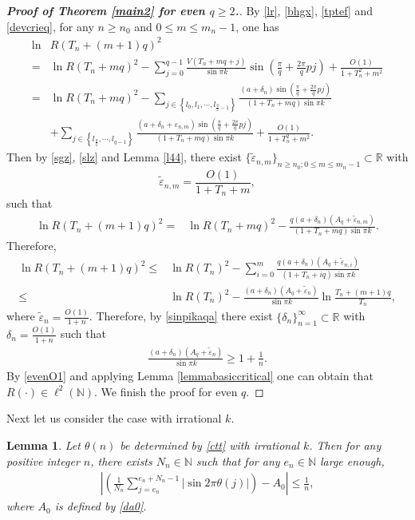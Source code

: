 \documentclass[12pt]{amsart}
\newcommand{\abs}[1]{\left\lvert #1 \right\rvert}
\theoremstyle{plain}
\newtheorem{lemma}[theorem]{Lemma}
\newcommand{\R}{\mathbb{R}}
\theoremstyle{definition}
\begin{document}
\begin{proof}[\textbf{Proof of Theorem \ref{main2} for even $q\geq2$.}]
By \eqref{lr}, \eqref{bhgx}, \eqref{tptef} and \eqref{devcrieq}, for any $n\geq n_0$ and $0\leq m\leq m_n-1$, one has
		\begin{align}
			\ln &R({T}_{n}+(m+1)q)^2\nonumber\\
=&\ln R({T}_{n}+mq)^2-\sum_{j=0}^{q-1}\frac{V({T}_{n}+mq+j)}{\sin\pi k}\sin\left(\frac{\pi}{q}+\frac{2\pi}{q}pj\right)+\frac{O(1)}{1+{T}_{n}^2+m^2}\nonumber\\
=&\ln R({T}_{n}+mq)^2-\sum_{j\in\left\{l_0,l_1,\cdots,l_{\frac{q}{2}-1}\right\}}\frac{(a+\delta_n)\sin\left(\frac{\pi}{q}+\frac{2\pi}{q}pj\right)}{(1+T_n+mq)\sin\pi k}\nonumber\\
&+\sum_{j\in\left\{l_{\frac{q}{2}},\cdots,l_{q-1}\right\}}\frac{(a+\delta_n+\varepsilon_{n,m})\sin\left(\frac{\pi}{q}+\frac{2\pi}{q}pj\right)}{(1+T_n+mq)\sin\pi k}+\frac{O(1)}{1+{T}_{n}^2+m^2}.\nonumber
		\end{align}
Then by \eqref{sgz}, \eqref{slz} and Lemma \ref{l44}, there exist $\{\tilde{\varepsilon}_{n,m}\}_{n\geq n_0;0\leq m\leq m_n-1}\subset \R$ with
$$\tilde{\varepsilon}_{n,m}=\frac{O(1)}{1+{T}_{n}+m},$$
such that
\begin{align}
	\ln R({T}_{n}+(m+1)q)^2=&\ln R({T}_{n}+mq)^2-\frac{q(a+\delta_n)(A_q+\tilde{\varepsilon}_{n,m})}{(1+T_n+mq)\sin\pi k}.\nonumber
\end{align}
Therefore,
\begin{align}
\ln R(T_n+(m+1)q)^2\leq& \ln R(T_n)^2-\sum_{i=0}^{m}\frac{q(a+\delta_n)(A_q+\tilde{\varepsilon}_{n,i})}{(1+T_n+iq)\sin\pi k}\nonumber\\
\leq &\ln R(T_n)^2-\frac{(a+\delta_n)(A_q+\tilde{\varepsilon}_n)}{\sin\pi k}\ln \frac{T_{n}+(m+1)q}{T_n},\nonumber
\end{align}
where $\tilde{\varepsilon}_n=\frac{O(1)}{1+n}$. Therefore, by \eqref{sinpikaqa} there exist $\{\delta_n\}_{n=1}^\infty\subset\R$ with $\delta_n=\frac{O(1)}{1+n}$ such that
\begin{align}
\frac{(a+\delta_n)(A_q+\tilde{\varepsilon}_n)}{\sin\pi k}\geq 1+\frac{1}{n}.\nonumber
\end{align}
By \eqref{evenO1} and applying Lemma \ref{lemmabasiccritical} one can obtain that $R(\cdot)\in\ell^2(\mathbb{N})$. 
		We finish the proof for even $q$.
	\end{proof}

	Next let us consider the case with irrational $k$. 
	\begin{lemma}\cite[{Lemma 3.4}]{LiuDiscrete} \label{l43}
		Let $\theta(n)$ be determined by \eqref{ctt} with irrational $k$. Then for any positive integer $n$, there exists $N_{n}\in\mathbb{N}$ such that for any $e_{n}\in\mathbb{N}$ large enough,
		\begin{align}
			\abs{\left(\frac{1}{N_{n}}\sum_{j=e_n}^{e_n+N_{n}-1}\abs{\sin2\pi\theta(j)}\right)-A_0}\leq\frac{1}{{n}},
		\end{align}
		where $A_0$ is defined by \eqref{da0}.	
		\end{lemma}
	
\end{document}
